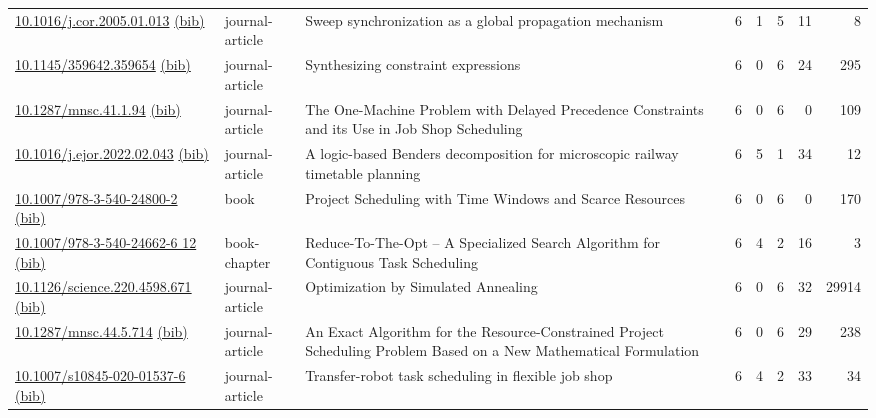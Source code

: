 {\begin{longtable}{p{5cm}lp{11cm}rrrrr}
\href{http://dx.doi.org/10.1016/j.cor.2005.01.013}{10.1016/j.cor.2005.01.013} \href{https://www.doi2bib.org/bib/10.1016/j.cor.2005.01.013}{(bib)} & journal-article & Sweep synchronization as a global propagation mechanism & 6 & 1 & 5 & 11 & 8 \\
\href{http://dx.doi.org/10.1145/359642.359654}{10.1145/359642.359654} \href{https://www.doi2bib.org/bib/10.1145/359642.359654}{(bib)} & journal-article & Synthesizing constraint expressions & 6 & 0 & 6 & 24 & 295 \\
\href{http://dx.doi.org/10.1287/mnsc.41.1.94}{10.1287/mnsc.41.1.94} \href{https://www.doi2bib.org/bib/10.1287/mnsc.41.1.94}{(bib)} & journal-article & The One-Machine Problem with Delayed Precedence Constraints and its Use in Job Shop Scheduling & 6 & 0 & 6 & 0 & 109 \\
\href{http://dx.doi.org/10.1016/j.ejor.2022.02.043}{10.1016/j.ejor.2022.02.043} \href{https://www.doi2bib.org/bib/10.1016/j.ejor.2022.02.043}{(bib)} & journal-article & A logic-based Benders decomposition for microscopic railway timetable planning & 6 & 5 & 1 & 34 & 12 \\
\href{http://dx.doi.org/10.1007/978-3-540-24800-2}{10.1007/978-3-540-24800-2} \href{https://www.doi2bib.org/bib/10.1007/978-3-540-24800-2}{(bib)} & book & Project Scheduling with Time Windows and Scarce Resources & 6 & 0 & 6 & 0 & 170 \\
\href{http://dx.doi.org/10.1007/978-3-540-24662-6_12}{10.1007/978-3-540-24662-6 12} \href{https://www.doi2bib.org/bib/10.1007/978-3-540-24662-6_12}{(bib)} & book-chapter & Reduce-To-The-Opt – A Specialized Search Algorithm for Contiguous Task Scheduling & 6 & 4 & 2 & 16 & 3 \\
\href{http://dx.doi.org/10.1126/science.220.4598.671}{10.1126/science.220.4598.671} \href{https://www.doi2bib.org/bib/10.1126/science.220.4598.671}{(bib)} & journal-article & Optimization by Simulated Annealing & 6 & 0 & 6 & 32 & 29914 \\
\href{http://dx.doi.org/10.1287/mnsc.44.5.714}{10.1287/mnsc.44.5.714} \href{https://www.doi2bib.org/bib/10.1287/mnsc.44.5.714}{(bib)} & journal-article & An Exact Algorithm for the Resource-Constrained Project Scheduling Problem Based on a New Mathematical Formulation & 6 & 0 & 6 & 29 & 238 \\
\href{http://dx.doi.org/10.1007/s10845-020-01537-6}{10.1007/s10845-020-01537-6} \href{https://www.doi2bib.org/bib/10.1007/s10845-020-01537-6}{(bib)} & journal-article & Transfer-robot task scheduling in flexible job shop & 6 & 4 & 2 & 33 & 34 \\

\end{longtable}}
